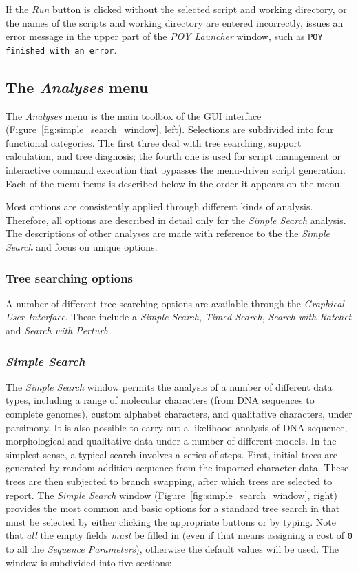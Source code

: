 If the \emph{Run} button is clicked without the selected script and
working directory, or the names of the scripts and working directory are entered incorrectly, \poy issues an
error message in the upper part of the \emph{POY Launcher} window,
such as \texttt{POY finished with an error}.

\subsection{The \emph{Analyses} menu}
The \emph{Analyses} menu is the main toolbox of the \poy GUI interface (Figure~\ref{fig:simple_search_window}, left). 
Selections are subdivided into four functional categories. The first three deal with tree searching, support calculation, 
and tree diagnosis; the fourth one is used for  script management or interactive command execution that bypasses the 
menu-driven script generation. Each of the menu items is described below in the order it appears on the menu.

Most options are consistently applied through different kinds of analysis. Therefore, all options are described in detail 
only for the \emph{Simple Search} analysis. The descriptions of other analyses are made with reference to the the 
\emph{Simple Search} and focus on unique options.


\subsubsection{Tree searching options}

A number of different tree searching options are available through the \emph{Graphical User Interface}.  
These include a \emph{Simple Search}, \emph{Timed Search}, \emph{Search with Ratchet} and 
\emph{Search with Perturb}. 

\subsubsection*{\emph{Simple Search}}
The \emph{Simple Search} window permits the analysis of a number of different data types, 
including a range of molecular characters (from DNA sequences to complete genomes), custom alphabet 
characters, and qualitative characters, under parsimony.  It is also possible to carry out a likelihood 
analysis of DNA sequence, morphological and qualitative data under a number of different models.  
In the simplest sense, a typical search involves a series of steps. First, initial trees are generated by random addition sequence 
from the imported character data. These trees are then subjected to branch swapping, after which trees 
are selected to report. The \emph{Simple Search} window (Figure~\ref{fig:simple_search_window}, right) 
provides the most common and basic options for a standard tree search in \poy that must be selected 
by either clicking the appropriate buttons or by typing. Note that \emph{all} the empty fields \emph{must} 
be filled in (even if that means assigning a cost of \texttt{0} to all the \emph{Sequence Parameters}), 
otherwise the default values will be used. The window is subdivided into five sections: 

